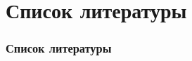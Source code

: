 
\section{Список литературы}

\begin{frame}
\frametitle{Список литературы}
\nocite{*}
\printbibliography %
\end{frame}
